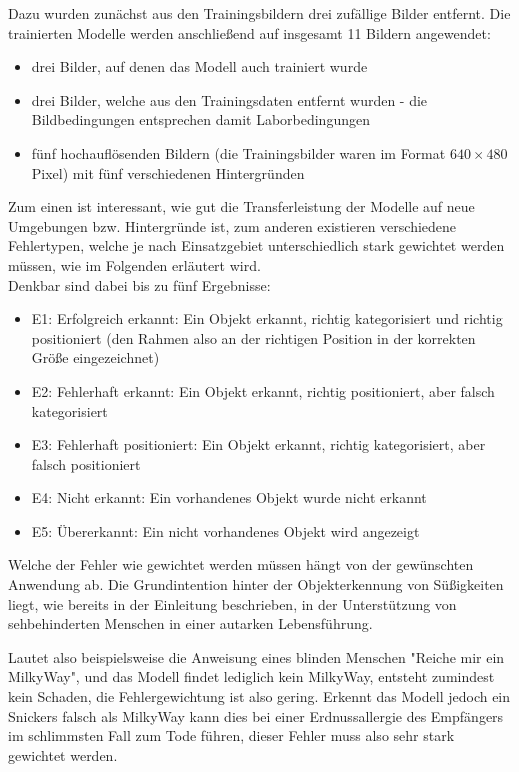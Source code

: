 \documentclass[12pt, oneside]{article}
\begin{document}
Dazu wurden zunächst aus den Trainingsbildern drei zufällige Bilder entfernt. Die trainierten Modelle werden anschließend auf insgesamt 11 Bildern angewendet:
\begin{itemize}
	\item drei Bilder, auf denen das Modell auch trainiert wurde
	\item drei Bilder, welche aus den Trainingsdaten entfernt wurden - die Bildbedingungen entsprechen damit Laborbedingungen
	\item fünf hochauflösenden Bildern (die Trainingsbilder waren im Format $640\times480$ Pixel) mit fünf verschiedenen Hintergründen
\end{itemize}
Zum einen ist interessant, wie gut die Transferleistung der Modelle auf neue Umgebungen bzw. Hintergründe ist, zum anderen existieren verschiedene Fehlertypen, welche je nach Einsatzgebiet unterschiedlich stark gewichtet werden müssen, wie im Folgenden erläutert wird.\\

Denkbar sind dabei bis zu fünf Ergebnisse:

\begin{itemize}
	\item E1: Erfolgreich erkannt: Ein Objekt erkannt, richtig kategorisiert und richtig positioniert (den Rahmen also an der richtigen Position in der korrekten Größe eingezeichnet)
	\item E2: Fehlerhaft erkannt: Ein Objekt erkannt, richtig positioniert, aber falsch kategorisiert
	\item E3: Fehlerhaft positioniert: Ein Objekt erkannt, richtig kategorisiert, aber falsch positioniert
	\item E4: Nicht erkannt: Ein vorhandenes Objekt wurde nicht erkannt
	\item E5: Übererkannt: Ein nicht vorhandenes Objekt wird angezeigt
\end{itemize}
Welche der Fehler wie gewichtet werden müssen hängt von der gewünschten Anwendung ab. Die Grundintention hinter der Objekterkennung von Süßigkeiten liegt, wie bereits in der Einleitung beschrieben, in der Unterstützung von sehbehinderten Menschen in einer autarken Lebensführung.

Lautet also beispielsweise die Anweisung eines blinden Menschen "Reiche mir ein MilkyWay", und das Modell findet lediglich kein MilkyWay, entsteht zumindest kein Schaden, die Fehlergewichtung ist also gering. Erkennt das Modell jedoch ein Snickers falsch als MilkyWay kann dies bei einer Erdnussallergie des Empfängers im schlimmsten Fall zum Tode führen, dieser Fehler muss also sehr stark gewichtet werden.\\
\end{document}
